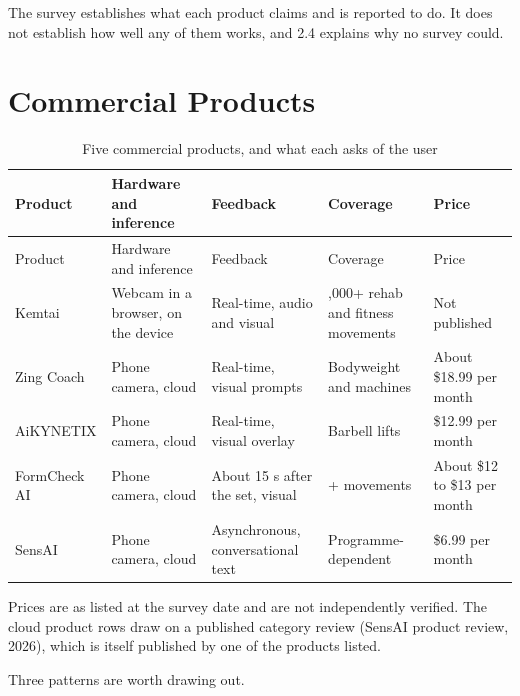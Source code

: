 The survey establishes what each product claims and is reported to do. It does not establish how well any of them works, and 2.4 explains why no survey could.

\section{Commercial Products}
\label{sec:2.2}

{\footnotesize
\setlength{\LTpre}{6pt}\setlength{\LTpost}{8pt}
\begin{longtable}{>{\raggedright\arraybackslash}p{}>{\raggedright\arraybackslash}p{}>{\raggedright\arraybackslash}p{}>{\raggedright\arraybackslash}p{}>{\raggedright\arraybackslash}p{}}
\caption{Five commercial products, and what each asks of the user}\\
\toprule
Product & Hardware and inference & Feedback & Coverage & Price \\
\midrule
\endfirsthead
\toprule
Product & Hardware and inference & Feedback & Coverage & Price \\
\midrule
\endhead
\bottomrule
\endfoot
\bottomrule
\endlastfoot
Kemtai & Webcam in a browser, on the device & Real-time, audio and visual & 2,000+ rehab and fitness movements & Not published \\
Zing Coach & Phone camera, cloud & Real-time, visual prompts & Bodyweight and machines & About \$18.99 per month \\
Ai\allowbreak{}KYNETIX & Phone camera, cloud & Real-time, visual overlay & Barbell lifts & \$12.99 per month \\
Form\allowbreak{}Check AI & Phone camera, cloud & About 15 s after the set, visual & 30+ movements & About \$12 to \$13 per month \\
SensAI & Phone camera, cloud & Asynchronous, conversational text & Programme-dependent & \$6.99 per month \\
\end{longtable}
}

Prices are as listed at the survey date and are not independently verified. The cloud product rows draw on a published category review (SensAI product review, 2026)\cite{sensai2026review}, which is itself published by one of the products listed.

Three patterns are worth drawing out.


